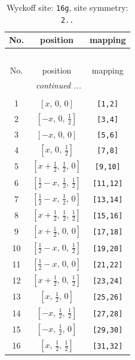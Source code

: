 \documentclass[fleqn,8pt]{jsarticle}
\begin{document}
\begin{longtable}{ccc}
\caption{Wyckoff site: {\tt 16g}, site symmetry: {\tt 2..}}
 \\
 \hline \hline
No. & position & mapping \\ \hline \endfirsthead

\multicolumn{2}{l}{\tablename\ \thetable{}} \\
 \hline \hline
No. & position & mapping \\ \hline \endhead

 \hline \hline
\multicolumn{2}{r}{\footnotesize\it continued ...} \\ \endfoot

 \hline \hline
\multicolumn{2}{r}{} \\ \endlastfoot

1 & $\left[ x,\, 0,\, 0 \right]$ & {\tt [1,2]} \\ \hline
2 & $\left[ - x,\, 0,\, \frac{1}{2} \right]$ & {\tt [3,4]} \\ \hline
3 & $\left[ - x,\, 0,\, 0 \right]$ & {\tt [5,6]} \\ \hline
4 & $\left[ x,\, 0,\, \frac{1}{2} \right]$ & {\tt [7,8]} \\ \hline
5 & $\left[ x + \frac{1}{2},\, \frac{1}{2},\, 0 \right]$ & {\tt [9,10]} \\ \hline
6 & $\left[ \frac{1}{2} - x,\, \frac{1}{2},\, \frac{1}{2} \right]$ & {\tt [11,12]} \\ \hline
7 & $\left[ \frac{1}{2} - x,\, \frac{1}{2},\, 0 \right]$ & {\tt [13,14]} \\ \hline
8 & $\left[ x + \frac{1}{2},\, \frac{1}{2},\, \frac{1}{2} \right]$ & {\tt [15,16]} \\ \hline
9 & $\left[ x + \frac{1}{2},\, 0,\, 0 \right]$ & {\tt [17,18]} \\ \hline
10 & $\left[ \frac{1}{2} - x,\, 0,\, \frac{1}{2} \right]$ & {\tt [19,20]} \\ \hline
11 & $\left[ \frac{1}{2} - x,\, 0,\, 0 \right]$ & {\tt [21,22]} \\ \hline
12 & $\left[ x + \frac{1}{2},\, 0,\, \frac{1}{2} \right]$ & {\tt [23,24]} \\ \hline
13 & $\left[ x,\, \frac{1}{2},\, 0 \right]$ & {\tt [25,26]} \\ \hline
14 & $\left[ - x,\, \frac{1}{2},\, \frac{1}{2} \right]$ & {\tt [27,28]} \\ \hline
15 & $\left[ - x,\, \frac{1}{2},\, 0 \right]$ & {\tt [29,30]} \\ \hline
16 & $\left[ x,\, \frac{1}{2},\, \frac{1}{2} \right]$ & {\tt [31,32]} \\
\end{longtable}
\end{document}
